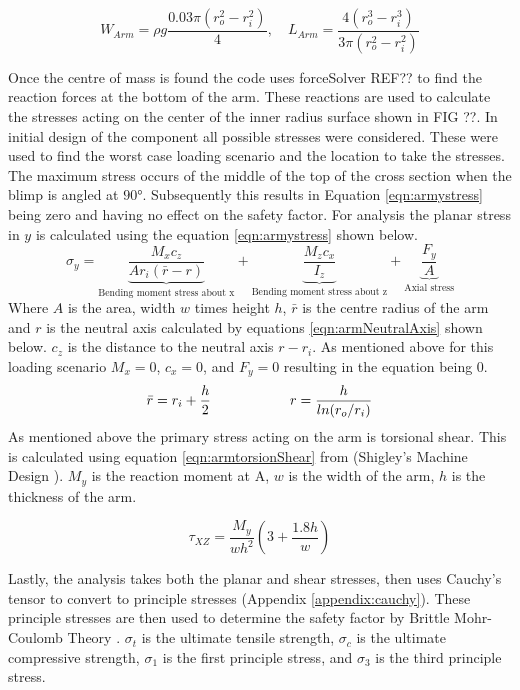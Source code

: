 \documentclass[../main.tex]{subfiles}
\begin{document}
\begin{equation} \label{eqn:armCg}
W_{Arm} = \rho g\frac{0.03\pi(r_o^2 - r_i^2)}{4}, \quad L_{Arm} =\frac{4(r_o^3 - r_i^3)}{3\pi(r_o^2 - r_i^2)}
\end{equation}

Once the centre of mass is found the code uses forceSolver REF?? to find the reaction forces at the bottom of the arm. These reactions are used to calculate the stresses acting on the center of the inner radius surface shown in FIG ??. In initial design of the component all possible stresses were considered. These were used to find the worst case loading scenario and the location to take the stresses. The maximum stress occurs of the middle of the top of the cross section when the blimp is angled at $90°$. Subsequently this results in Equation \ref{eqn:armystress} being zero and having no effect on the safety factor. For analysis the planar stress in $y$ is calculated using the equation \ref{eqn:armystress} shown below. 
\begin{equation}
\label{eqn:armystress}
\sigma_{y}=  \underbrace{\frac{M_{x}c_z}{A r_i (\bar{r} - r)}}_\text{Bending moment stress about x} + \underbrace{\frac{M_{z}c_x}{I_z}}_\text{Bending moment stress about z} + \underbrace{\frac{F_y}{A}}_\text{Axial stress} 
\end{equation}
Where $A$ is the area, width $w$ times height $h$, $\bar{r}$ is the centre radius of the arm and $r$ is the neutral axis calculated by equations \ref{eqn:armNeutralAxis} shown below. $c_z$ is the distance to the neutral axis $r - r_i$. As mentioned above for this loading scenario $M_x = 0$, $c_x = 0$, and $F_y = 0$ resulting in the equation being 0.
\begin{equation} \label{eqn:armNeutralAxis}
\bar{r} = r_i + \frac{h}{2} \hspace{20mm}  r = \frac{h}{ln(r_o/r_i)}
\end{equation}
As mentioned above the primary stress acting on the arm is torsional shear. This is calculated using equation \ref{eqn:armtorsionShear} from {(Shigley's Machine Design \cite[102]{shigley})}. $M_y$ is the reaction moment at A, $w$ is the width of the arm, $h$ is the thickness of the arm.

\begin{equation} \label{eqn:armtorsionShear}
\tau_{XZ} = \dfrac{M_{y}}{wh^2}(3+\frac{1.8h}{w})
\end{equation}

Lastly, the analysis takes both the planar and shear stresses, then uses Cauchy's tensor to convert to principle stresses (Appendix \ref{appendix:cauchy}). These principle stresses are then used to determine the safety factor by Brittle Mohr-Coulomb Theory \cite[227]{shigley}. $\sigma_t$ is the ultimate tensile strength, $\sigma_c$ is the ultimate compressive strength, $\sigma_1$ is the first principle stress, and $\sigma_3$ is the third principle stress.
\end{document}
